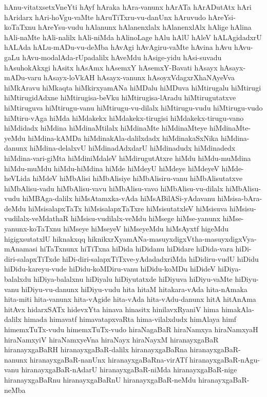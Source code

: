 {hAnu-vitatxsetxVneYti
hAyf
hAraka
hAra-vanunx
hArATa
hArADutAtx
hAri
hAridarx
hAri-hoVgu-vaMte
hAruTiTxru-vu-danUnx
hAruvudo
hAreYsi-koTaTxnu
hAreYsu-vudu
hAlanunx
hAlanenxlalx
hAlanenxlAlx
hAlige
hAlina
hAli-naMte
hAli-nalilx
hAli-niMda
hAlinoLage
hAlu
hAlU
hAleV
hALAgidadxrU
hALAda
hALu-mADu-vu-deMba
hAvAgi
hAvAgiru-vaMte
hAvina
hAvu
hAvu-gaLu
hAvu-modalAda-rUpadalilx
hAveMdu
hAsige-yidu
hAsi-suvadu
hAsuhokAkxgi
hAsitx
hAsAmx
hAsemxY
hAsemxY-Bavati
hAsayx
hAsayx-mADu-varu
hAsayx-loVkAH
hAsayx-vanunx
hAsoyxVdagxrXhaNAyeVva
hiMkAravu
hiMkaqta
hiMkirxyamANa
hiMDalu
hiMDuva
hiMtirugalu
hiMtirugi
hiMtirugidAdxne
hiMtirugisa-beVku
hiMtirugisa-lAradu
hiMtirugutatxve
hiMtiruguva
hiMtirugu-vanu
hiMtirugu-vu-dilalx
hiMtirugu-vudu
hiMtirugu-vudo
hiMtiru-vAga
hiMda
hiMdakekx
hiMdakekx-tirugisi
hiMdakekx-tirugu-vano
hiMdidadx
hiMdina
hiMdinaMtilalx
hiMdinaMte
hiMdinaMteye
hiMdinaMte-yeMdu
hiMdina-kAMDa
hiMdinakAla-dalilxdadx
hiMdinakaSxNika
hiMdina-danunx
hiMdina-delalxvU
hiMdinadAdxdarU
hiMdinadudx
hiMdinadedx
hiMdina-vari-giMta
hiMdiniMdaleV
hiMdirugutAtxre
hiMdu
hiMdu-muMdina
hiMdu-muMdu
hiMdu-hiMdina
hiMde
hiMdeyU
hiMdeye
hiMdeyeV
hiMde-heVLida
hiMdeV
hiMbAlisi
hiMbAlisiye
hiMbAlisiru-vanu
hiMbAlisutatxve
hiMbAlisu-vadu
hiMbAlisu-vavu
hiMbAlisu-vavo
hiMbAlisu-vu-dilalx
hiMbAlisu-vudu
hiMBAga-dalilx
hiMsAtamxka-vAda
hiMsABilASi-yAdavanu
hiMsisa-bAra-deMdu
hiMsisalapxTaTx
hiMsisalapxTaTxre
hiMsisutatxleV
hiMsisuva
hiMsisu-vudilalx-veMdathaR
hiMsisu-vudilalx-veMdu
hiMsege
hiMse-yanunx
hiMse-yanunx-koTaTxnu
hiMseye
hiMseyeV
hiMseyeMdu
hiMsAyxtf
higeMdu
higigxsutatxlU
hiknakxqq
hiknikxrXyamANa-masuyxdigxVtha-masuyxdigxVya-mAnamasi
hiTaTxnunx
hiTiTxna
hiDida
hiDidanu
hiDidare
hiDida-vara
hiDi-diri-salapxTiTxde
hiDi-diri-salapxTiTxve-yAdadadxriMda
hiDidiru-vudU
hiDidu
hiDidu-kareyu-vude
hiDidu-koMDiru-vanu
hiDidu-koMDu
hiDideV
hiDiya-balalxdu
hiDiya-balalxnu
hiDiyalu
hiDiyutatxde
hiDiyuva
hiDiyu-vaMte
hiDiyu-vanu
hiDiyu-vu-danunx
hiDiyu-vudu
hita
hitaM
hitakara-vAda
hita-nAmaka
hita-miti
hita-vanunx
hita-vAgide
hita-vAda
hita-vAdu-danunx
hitA
hitAnAma
hitAvx
hidarxSATx
hidevxYta
hinava
hinasitx
hinilavxRyaniV
hima
himakAla-dalilx
himada
himavatf
himavatapxvaRta
hima-vilalxdudx
himAlaya
himf
himemxTuTx-vudu
himemxTuTx-vudo
hiraNagaBaR
hiraNamxya
hiraNamxyaH
hiraNamxyiV
hiraNamxyeVna
hiraNayx
hiraNayxM
hiranayxgaBaR
hiranayxgaBaRH
hiranayxgaBaR-dalilx
hiranayxgaBaRna
hiranayxgaBaR-nanunx
hiranayxgaBaR-nanUnx
hiranayxgaBaRna-virATf
hiranayxgaBaR-nAgu-vanu
hiranayxgaBaR-nAdarU
hiranayxgaBaR-niMda
hiranayxgaBaR-nige
hiranayxgaBaRnu
hiranayxgaBaRnU
hiranayxgaBaR-neMdu
hiranayxgaBaR-neMba
}
